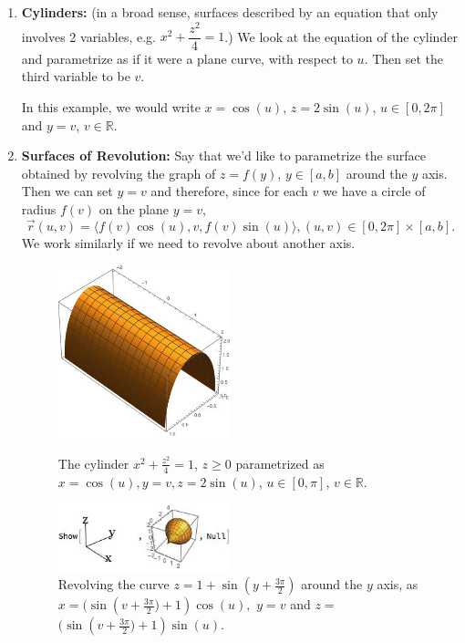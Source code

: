 \documentclass[12pt]{article}
\newcommand{\R}{ \mathbb{R}}
\newcommand{\vr}{\vec{r}{}}
\renewcommand{\lg}{\langle}
\newcommand{\rg}{\rangle}
\begin{document}
\begin{enumerate}
\item\textbf{Cylinders:} (in a broad sense, surfaces described by an equation that only involves 2 variables, e.g. $x^2+\dfrac{z^2}{4}=1$.) We look at the equation of the cylinder and parametrize as if it were a plane curve, with respect to $u$. Then set the third variable to be $v$.

In this example, we would write $x=\cos(u)$, $z=2\sin(u)$, $u\in [0,2\pi]$ and $y=v$, $v\in \R$. 


\item \textbf{Surfaces of Revolution:} Say that we'd like to parametrize the surface obtained by revolving the graph of $z=f(y)$, $y\in [a,b]$ around the $y$ axis. Then we can set $y=v$ and therefore, since for each $v$ we have a circle of radius $f(v)$ on the plane $y=v$, $$\vr(u,v)=\lg f(v)\cos(u),v,f(v)\sin(u)\rg, (u,v)\in[0,2\pi]\times [a,b].$$ We work similarly if we need to revolve about another axis.
\begin{figure}[h]
\centering
\parbox{5cm}{
\includegraphics[width=5cm]{cylinder.jpeg}
\caption{The cylinder $x^2+\frac{z^2}{4}=1$, $z\geq 0$ parametrized as $x=\cos(u), y=v, z=2\sin(u)$, $u\in [0,\pi]$, $v\in\R$. }
\label{fig3}}
\qquad
\begin{minipage}{5cm}
\includegraphics[width=5cm]{onion.jpeg}
\caption{Revolving the curve $z=1+\sin(y+\frac{3\pi}{2})$ around the $y$ axis, as $x=( \sin \left(v+\frac{3 \pi }{2})+1\right)\cos (u),$ $y=v$ and $z=$ \\$(\sin \left(v+\frac{3 \pi }{2})+1\right)\sin (u)$.}
\label{fig4}
\end{minipage}
\end{figure}


\end{enumerate}
\end{document}

